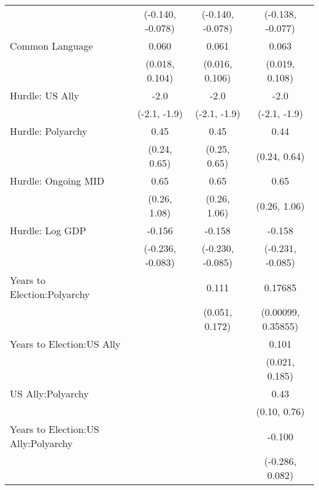 \begin{longtable}[t]{lccc}
 & (-0.140, -0.078) & (-0.140, -0.078) & (-0.138, -0.077)\\
Common Language & 0.060 & 0.061 & 0.063\\
 & (0.018, 0.104) & (0.016, 0.106) & (0.019, 0.108)\\
Hurdle: US Ally & -2.0 & -2.0 & -2.0\\
 & (-2.1, -1.9) & (-2.1, -1.9) & (-2.1, -1.9)\\
Hurdle: Polyarchy & 0.45 & 0.45 & 0.44\\
 & (0.24, 0.65) & (0.25, 0.65) & (0.24, 0.64)\\
Hurdle: Ongoing MID & 0.65 & 0.65 & 0.65\\
 & (0.26, 1.08) & (0.26, 1.06) & (0.26, 1.06)\\
Hurdle: Log GDP & -0.156 & -0.158 & -0.158\\
 & (-0.236, -0.083) & (-0.230, -0.085) & (-0.231, -0.085)\\
Years to Election:Polyarchy &  & 0.111 & 0.17685\\
 &  & (0.051, 0.172) & (0.00099, 0.35855)\\
Years to Election:US Ally &  &  & 0.101\\
 &  &  & (0.021, 0.185)\\
US Ally:Polyarchy &  &  & 0.43\\
 &  &  & (0.10, 0.76)\\
Years to Election:US Ally:Polyarchy &  &  & -0.100\\
 &  &  & (-0.286, 0.082)\\
\bottomrule
\end{longtable}
